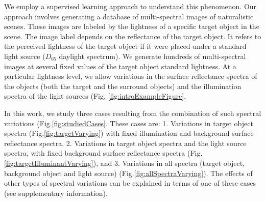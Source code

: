 \documentclass{jov}
\begin{document}

We employ a supervised learning approach to understand this phenomenon. Our approach involves generating a database of multi-spectral images of naturalistic scenes. These images are labeled by the lightness of a specific target object in the scene. The image label depends on the reflectance of the target object. It refers to the perceived lightness of the target object if it were placed under a standard light source ($D_{65}$ daylight spectrum). We generate hundreds of multi-spectral images at several fixed values of the target object standard lightness. At a particular lightness level, we allow variations in the surface reflectance spectra of the objects (both the target and the surround objects) and the illumination spectra of the light sources (Fig. \ref{fig:introExampleFigure}. 

In this work, we study three cases resulting from the combination of such spectral variations (Fig.\ref{fig:studiedCases}. These cases are: 1. Variations in target object spectra (Fig.\ref{fig:targetVarying}) with fixed illumination and background surface reflectance spectra, 2. Variations in target object spectra and the light source spectra, with fixed background surface reflectance spectra (Fig.\ref{fig:targetIlluminantVarying}), and 3. Variations in all spectra (target object, background object and light source) (Fig.\ref{fig:allSpectraVarying}). The effects of other types of spectral variations can be explained in terms of one of these cases (see supplementary information).
\end{document}
